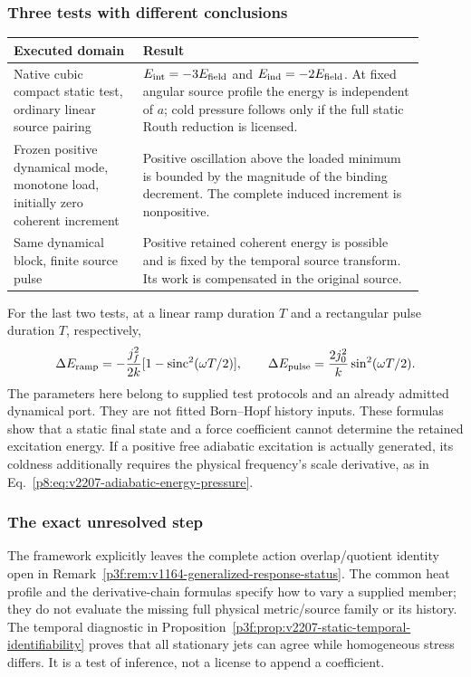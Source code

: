 \documentclass[12pt,a4paper]{article}
\begin{document}
\subsubsection{Three tests with different conclusions}
\begin{center}
\begin{tabular}{p{0.29\linewidth}p{0.61\linewidth}}
\hline
Executed domain & Result\\
\hline
Native cubic compact static test, ordinary linear source pairing
& $E_{\rm int}=-3E_{\rm field}$ and $E_{\rm ind}=-2E_{\rm field}$.
At fixed angular source profile the energy is independent of $a$;
cold pressure follows only if the full static Routh reduction is licensed.\\
Frozen positive dynamical mode, monotone load, initially zero coherent increment
& Positive oscillation above the loaded minimum is bounded by the magnitude
of the binding decrement. The complete induced increment is nonpositive.\\
Same dynamical block, finite source pulse
& Positive retained coherent energy is possible and is fixed by the temporal
source transform. Its work is compensated in the original source.\\
\hline
\end{tabular}
\end{center}

For the last two tests, at a linear ramp duration $T$ and a rectangular
pulse duration $T$, respectively,
\[
 \Delta E_{\rm ramp}=-\frac{j_f^2}{2k}
      [1-\operatorname{sinc}^2(\omega T/2)],\qquad
 \Delta E_{\rm pulse}=\frac{2j_0^2}{k}\sin^2(\omega T/2).
\]
The parameters here belong to supplied test protocols and an already
admitted dynamical port. They are not fitted Born--Hopf history inputs.
These formulas show that a static final state and a force coefficient
cannot determine the retained excitation energy. If a positive free
adiabatic excitation is actually generated, its coldness additionally
requires the physical frequency's scale derivative, as in
Eq.~\eqref{p8:eq:v2207-adiabatic-energy-pressure}.

\subsubsection{The exact unresolved step}
The framework explicitly leaves the complete action overlap/quotient
identity open in Remark~\ref{p3f:rem:v1164-generalized-response-status}.
The common heat profile and the derivative-chain formulas specify how to
vary a supplied member; they do not evaluate the missing full physical
metric/source family or its history. The temporal diagnostic in
Proposition~\ref{p3f:prop:v2207-static-temporal-identifiability} proves that
all stationary jets can agree while homogeneous stress differs. It is a
test of inference, not a license to append a coefficient.
\end{document}
